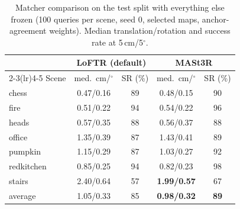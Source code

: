 \documentclass[journal]{IEEEtran}
\begin{document}
\begin{table}[t]
\caption{Matcher comparison on the test split with everything else frozen
(100 queries per scene, seed 0, selected maps, anchor-agreement weights).
Median translation/rotation and success rate at 5\,cm/5$^\circ$.}
\label{tab:matcher}
\centering\footnotesize
\setlength{\tabcolsep}{4pt}
\begin{tabular}{@{}lcccc@{}}
\toprule
& \multicolumn{2}{c}{LoFTR (default)} & \multicolumn{2}{c}{MASt3R} \\
\cmidrule(lr){2-3}\cmidrule(lr){4-5}
Scene & med.\ cm/$^\circ$ & SR (\%) & med.\ cm/$^\circ$ & SR (\%) \\
\midrule
chess      & 0.47/0.16 & 89 & 0.48/0.15 & 90 \\
fire       & 0.51/0.22 & 94 & 0.54/0.22 & 96 \\
heads      & 0.57/0.35 & 88 & 0.56/0.37 & 88 \\
office     & 1.35/0.39 & 87 & 1.43/0.41 & 89 \\
pumpkin    & 1.15/0.29 & 87 & 1.03/0.27 & 92 \\
redkitchen & 0.85/0.25 & 94 & 0.82/0.23 & 98 \\
stairs     & 2.40/0.64 & 57 & \textbf{1.99/0.57} & 67 \\
\midrule
average    & 1.05/0.33 & 85 & \textbf{0.98/0.32} & \textbf{89} \\
\bottomrule
\end{tabular}
\end{table}
\end{document}
